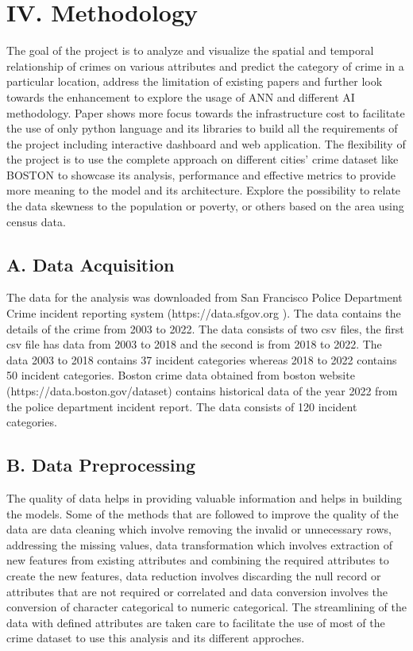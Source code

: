 \documentclass[10 pt,conference,final,]{IEEEtran}
\begin{document}
\section{IV. Methodology}\label{iv.-methodology}

The goal of the project is to analyze and visualize the spatial and
temporal relationship of crimes on various attributes and predict the
category of crime in a particular location, address the limitation of
existing papers and further look towards the enhancement to explore the
usage of ANN and different AI methodology. Paper shows more focus
towards the infrastructure cost to facilitate the use of only python
language and its libraries to build all the requirements of the project
including interactive dashboard and web application. The flexibility of
the project is to use the complete approach on different cities' crime
dataset like BOSTON to showcase its analysis, performance and effective
metrics to provide more meaning to the model and its architecture.
Explore the possibility to relate the data skewness to the population or
poverty, or others based on the area using census data.

\subsection{A. Data Acquisition}\label{a.-data-acquisition}

The data for the analysis was downloaded from San Francisco Police
Department Crime incident reporting system (https://data.sfgov.org ).
The data contains the details of the crime from 2003 to 2022. The data
consists of two csv files, the first csv file has data from 2003 to 2018
and the second is from 2018 to 2022. The data 2003 to 2018 contains 37
incident categories whereas 2018 to 2022 contains 50 incident
categories. Boston crime data obtained from boston website
(https://data.boston.gov/dataset) contains historical data of the year
2022 from the police department incident report. The data consists of
120 incident categories.

\subsection{B. Data Preprocessing}\label{b.-data-preprocessing}

The quality of data helps in providing valuable information and helps in
building the models. Some of the methods that are followed to improve
the quality of the data are data cleaning which involve removing the
invalid or unnecessary rows, addressing the missing values, data
transformation which involves extraction of new features from existing
attributes and combining the required attributes to create the new
features, data reduction involves discarding the null record or
attributes that are not required or correlated and data conversion
involves the conversion of character categorical to numeric categorical.
The streamlining of the data with defined attributes are taken care to
facilitate the use of most of the crime dataset to use this analysis and
its different approches.
\end{document}
